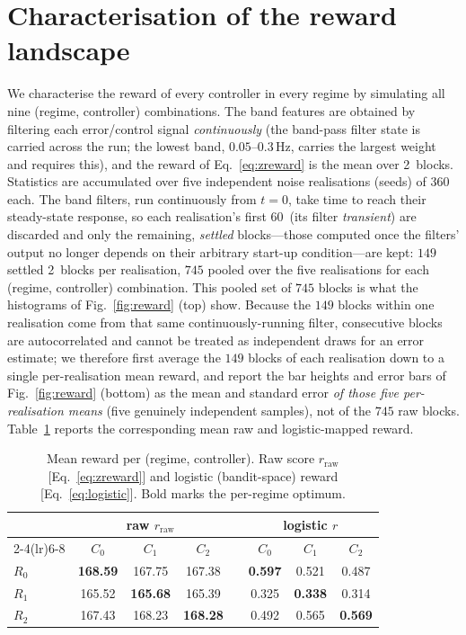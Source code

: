 \documentclass[11pt,a4paper]{article}
\newcommand{\SI}[2]{#1\,\text{#2}}
\newcommand{\Cz}{C_{0}}
\newcommand{\Co}{C_{1}}
\newcommand{\Ct}{C_{2}}
\begin{document}
\section{Characterisation of the reward landscape}\label{sec:reward}
We characterise the reward of every controller in every regime by simulating
all nine (regime, controller) combinations. The band features are obtained by
filtering each error/control signal \emph{continuously} (the band-pass filter
state is carried across the run; the lowest band, $0.05$--$0.3$\,Hz, carries the
largest weight and requires this), and the reward of Eq.~\eqref{eq:zreward} is
the mean over \SI{2}{s} blocks. Statistics are accumulated over five independent
noise realisations (seeds) of \SI{360}{s} each. The band filters, run
continuously from $t=0$, take time to reach their steady-state response, so
each realisation's first \SI{60}{s} (its filter \emph{transient}) are discarded
and only the remaining, \emph{settled} blocks---those computed once the
filters' output no longer depends on their arbitrary start-up condition---are
kept: $149$ settled \SI{2}{s} blocks per realisation, $745$ pooled over the
five realisations for each (regime, controller) combination. This pooled set
of $745$ blocks is what the histograms of Fig.~\ref{fig:reward} (top) show.
Because the $149$ blocks within one realisation come from that same
continuously-running filter, consecutive blocks are autocorrelated and cannot
be treated as independent draws for an error estimate; we therefore first
average the $149$ blocks of each realisation down to a single per-realisation
mean reward, and report the bar heights and error bars of
Fig.~\ref{fig:reward} (bottom) as the mean and standard error \emph{of those
five per-realisation means} (five genuinely independent samples), not of the
$745$ raw blocks. Table~\ref{tab:reward} reports the corresponding mean raw
and logistic-mapped reward.

\begin{table}[t]
  \centering
  \caption{Mean reward per (regime, controller). Raw score $r_{\mathrm{raw}}$
  [Eq.~\eqref{eq:zreward}] and logistic (bandit-space) reward
  [Eq.~\eqref{eq:logistic}]. Bold marks the per-regime optimum.}
  \label{tab:reward}
  \begin{tabular}{l ccc c ccc}
    \toprule
     & \multicolumn{3}{c}{raw $r_{\mathrm{raw}}$} & & \multicolumn{3}{c}{logistic $r$} \\
     \cmidrule(lr){2-4}\cmidrule(lr){6-8}
     & $\Cz$ & $\Co$ & $\Ct$ & & $\Cz$ & $\Co$ & $\Ct$ \\
    \midrule
    $R_0$ & \textbf{168.59} & 167.75 & 167.38 & & \textbf{0.597} & 0.521 & 0.487 \\
    $R_1$ & 165.52 & \textbf{165.68} & 165.39 & & 0.325 & \textbf{0.338} & 0.314 \\
    $R_2$ & 167.43 & 168.23 & \textbf{168.28} & & 0.492 & 0.565 & \textbf{0.569} \\
    \bottomrule
  \end{tabular}
\end{table}
\end{document}
